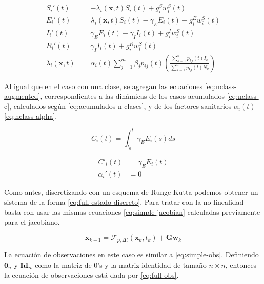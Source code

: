 \begin{subequations}\label{eq:full-model}
\begin{align}
S_i'(t) &= -\lambda_i(\mathbf{x}, t) S_i(t) + g^S_i w^S_i(t)\\
E_i'(t) &= \lambda_i(\mathbf{x}, t) S_i(t) - \gamma_E E_i(t) + g^E_i w^S_i(t) \nonumber\\
I_i'(t) &= \gamma_E E_i(t) - \gamma_{I} I_i(t) + g^I_i w^S_i(t)\nonumber \\
R_i'(t) &= \gamma_{I} I_i(t) + g^R_i w^S_i(t) \nonumber \\
\lambda_i(\mathbf{x}, t) &= \alpha_i(t)\sum_{j=1}^m \beta_{j}p_{ij}(t)\left(\frac{\sum_{k=1}^{n}p_{kj}(t) I_k}{\sum_{k=1}^{n}p_{kj}(t)N_k}\right) \label{eq:full-lambda}
\end{align}
\end{subequations}


Al igual que en el caso con una clase, se agregan las ecuaciones \ref{eq:nclass-augmented}, correspondientes a las dinámicas de los casos acumulados \ref{eq:nclass-c}, calculados según \ref{eq:acumulados-n-clases}, y de los factores sanitarios \(\alpha_i(t)\) \ref{eq:nclass-alpha}. 

\begin{equation}\label{eq:acumulados-n-clases}
C_i(t) = \int_{t_0}^t \gamma_E E_i(s) ds    
\end{equation}

\begin{subequations}\label{eq:nclass-augmented}
\begin{align}
C'_i(t) &= \gamma_E E_i(t) \label{eq:nclass-c}\\
\alpha_i'(t) &= 0 \label{eq:nclass-alpha}
\end{align}
\end{subequations}


Como antes, discretizando con un esquema de Runge Kutta podemos obtener un sistema de la forma \ref{eq:full-estado-discreto}. Para tratar con la no linealidad basta con usar las mismas ecuaciones \ref{eq:simple-jacobian} calculadas previamente para el jacobiano.

\begin{equation} \label{eq:full-estado-discreto}
\mathbf{x}_{k+1} = \mathcal{F}_{p, \Delta t}(\mathbf{x}_k, t_k) +  \mathbf{G}\mathbf{w}_{k} 
\end{equation}

La ecuación de observaciones en este caso es similar a \ref{eq:simple-obs}. Definiendo \(\mathbf{0}_n\) y \(\text{\textbf{Id}}_n\) como la matriz de 0's y la matriz identidad de tamaño \(n \times n\), entonces la ecuación de observaciones está dada por \ref{eq:full-obs}.

